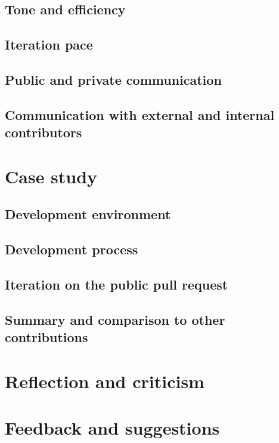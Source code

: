 \documentclass[12pt]{scrartcl}
\let\oldsection\section
\renewcommand\section{\clearpage\oldsection}
\begin{document}
\subsection{Tone and efficiency}

\subsection{Iteration pace}

\subsection{Public and private communication}

\subsection{Communication with external and internal contributors}

\section{Case study}

\subsection{Development environment}

\subsection{Development process}

\subsection{Iteration on the public pull request}

\subsection{Summary and comparison to other contributions}

\section{Reflection and criticism}

\section{Feedback and suggestions}
\end{document}
